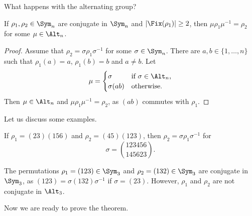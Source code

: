 What happens with the alternating group? 

\begin{lemma}
If $\rho_1,\rho_2\in\Sym_n$ are conjugate in $\Sym_n$ and  $|\Fix(\rho_1)|\geq2$, then 
$\mu\rho_1\mu^{-1}=\rho_2$ for some $\mu\in\Alt_n$.  
\end{lemma}

\begin{proof}
Assume that $\rho_2=\sigma\rho_1\sigma^{-1}$ for some $\sigma\in\Sym_n$. 
There are $a,b\in\{1,\dots,n\}$ such that
$\rho_1(a)=a$, $\rho_1(b)=b$ and $a\ne b$. Let 
\[
\mu=\begin{cases}
\sigma & \text{if $\sigma\in\Alt_n$,}\\
\sigma(ab) & \text{otherwise.}
\end{cases}
\]
Then $\mu\in\Alt_n$ and $\mu\rho_1\mu^{-1}=\rho_2$, as 
$(ab)$ commutes with $\rho_1$. 
\end{proof}

Let us discuss some examples.

\begin{example}
If $\rho_1=(23)(156)$ and $\rho_2=(45)(123)$, then 
$\rho_2=\sigma\rho_1\sigma^{-1}$ for  
\[
\sigma=\binom{123456}{145623}.
\]
\end{example}

\begin{example}
The permutations $\rho_1=(123)\in\Sym_3$ and $\rho_2=(132)\in\Sym_3$ are conjugate 
in $\Sym_3$, as  
$(123)=\sigma(132)\sigma^{-1}$ if $\sigma=(23)$. However, $\rho_1$ and $\rho_2$ are not conjugate in $\Alt_3$. 
\end{example}

Now we are ready to prove the theorem. 

